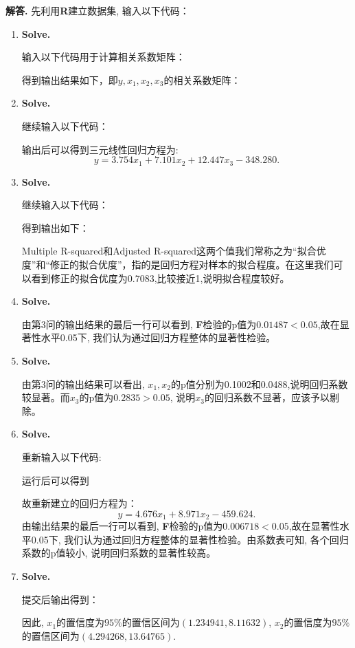\documentclass[12pt, a4paper, oneside]{ctexart}
\newenvironment{solution}{\par\noindent\textbf{解答. }}{\par}
\begin{document}
\begin{solution}
	先利用\textbf{R}建立数据集, 输入以下代码：
	
	\begin{enumerate}
		\item {\tt}    {\bf Solve.} 
		
		
		输入以下代码用于计算相关系数矩阵：
			
		得到输出结果如下，即$y,x_1,x_2,x_3$的相关系数矩阵：
        	
       
		\item {\tt }   {\bf Solve.}
		 
		 
		 继续输入以下代码：
			
		 输出后可以得到三元线性回归方程为:\[ y = 3.754x_1 +7.101x_2 + 12.447x_3-348.280. \]
		\item {\tt}    {\bf Solve.} 
	
	
	继续输入以下代码：
		
		得到输出如下：
			
           Multiple R-squared和Adjusted R-squared这两个值我们常称之为“拟合优度”和“修正的拟合优度”，指的是回归方程对样本的拟合程度。在这里我们可以看到修正的拟合优度为0.7083,比较接近1,说明拟合程度较好。
		\item {\tt }   {\bf Solve.}
		  
		  
		  由第3问的输出结果的最后一行可以看到, \textbf{F}检验的p值为$0.01487 < 0.05$,故在显著性水平0.05下, 我们认为通过回归方程整体的显著性检验。
		\item {\tt}    {\bf Solve.} 
		 
		 
		 由第3问的输出结果可以看出, $x_1,x_2$的p值分别为0.1002和0.0488,说明回归系数较显著。而$x_3$的p值为$0.2835>0.05$, 说明$x_3$的回归系数不显著，应该予以剔除。
		
		\item {\tt }   {\bf Solve.}
		
		重新输入以下代码:
		
		运行后可以得到
		
		故重新建立的回归方程为：
     	\[ y = 4.676x_1 +8.971x_2 - 459.624. \]
     	由输出结果的最后一行可以看到, \textbf{F}检验的p值为$0.006718 < 0.05$,故在显著性水平0.05下, 我们认为通过回归方程整体的显著性检验。由系数表可知, 各个回归系数的p值较小, 说明回归系数的显著性较高。
		\item {\tt}    {\bf Solve.} 
		
		提交后输出得到：
		
		因此, $x_1$的置信度为$95\%$的置信区间为$\left(1.234941,8.11632\right)$, $x_2$的置信度为$95\%$的置信区间为$\left(4.294268,13.64765\right)$.
		

\end{enumerate}
\end{solution}
\end{document}

